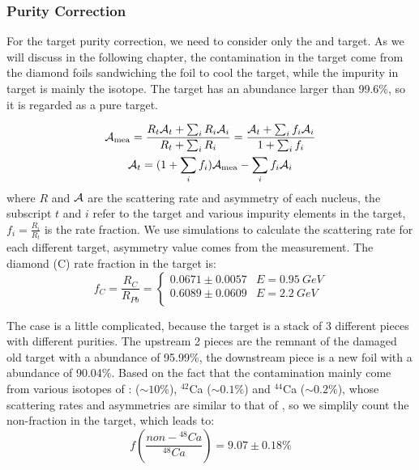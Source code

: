 \subsubsection{Purity Correction}
For the target purity correction, we need to consider only the \Pb and \Ca target.
As we will discuss in the following chapter, the contamination in the \Pb target
come from the diamond foils sandwiching the \Pb foil to cool the target, while
the impurity in \Ca target is mainly the \ca isotope. The \ca target has an abundance
larger than 99.6\%, so it is regarded as a pure target.

\begin{equation}
    \begin{gathered}
	\mathcal{A}_{\text{mea}} = \frac{R_t\mathcal{A}_t + \sum_i R_i \mathcal{A}_i}{R_t + \sum_i R_i} = \frac{\mathcal{A}_t + \sum_i f_i \mathcal{A}_i}{1 + \sum_i f_i}  \\
	\mathcal{A}_t = (1 + \sum_i f_i)\mathcal{A}_{\text{mea}} - \sum_i f_i\mathcal{A}_i
    \end{gathered}
    \label{eq:AT-asymmetry_correction}
\end{equation}
where $R$ and $\mathcal{A}$ are the scattering rate and asymmetry of each nucleus, the
subscript $t$ and $i$ refer to the target and various impurity elements in the target, 
$f_i = \frac{R_i}{R_t}$ is the rate fraction. 
We use simulations to calculate the scattering rate for each different
target, asymmetry value comes from the measurement. The diamond (C) rate fraction
in the \Pb target is:
\begin{equation}
    f_C = \frac{R_C}{R_{Pb}} = 
    \begin{cases}
	0.0671 \pm 0.0057   & E = 0.95\ GeV	\\
	0.6089 \pm 0.0609   & E = 2.2\ GeV	\\
    \end{cases}
\end{equation}

The \Ca case is a little complicated, because the \Ca target is a stack of 3 different
pieces with different purities. The upstream 2 pieces are the remnant of the damaged
old target with a \Ca abundance of 95.99\%, the downstream piece is a new foil
with a \Ca abundance of 90.04\%. Based on the fact that the contamination mainly
come from various isotopes of \Ca: \ca ($\sim10\%$), ${}^{42}$Ca ($\sim0.1\%$) and ${}^{44}$Ca ($\sim0.2\%$), 
whose scattering rates and asymmetries are similar to that of \Ca, so we simplily 
count the non-\Ca fraction in the \Ca target, which leads to:
\begin{equation}
    f(\frac{non-{}^{48}Ca}{{}^{48}Ca}) = 9.07 \pm 0.18 \%
\end{equation}

